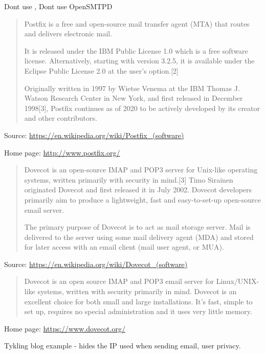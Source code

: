 \documentclass[Screen16to9,17pt]{foils}
\begin{document}
Dont use , Dont use OpenSMTPD




\begin{quote}
  Postfix is a free and open-source mail transfer agent (MTA) that routes and delivers electronic mail.

It is released under the IBM Public License 1.0 which is a free software license. Alternatively, starting with version 3.2.5, it is available under the Eclipse Public License 2.0 at the user's option.[2]

Originally written in 1997 by Wietse Venema at the IBM Thomas J. Watson Research Center in New York, and first released in December 1998[3], Postfix continues as of 2020 to be actively developed by its creator and other contributors.
\end{quote}
Source: \url{https://en.wikipedia.org/wiki/Postfix_(software)}

Home page: \url{http://www.postfix.org/}



\begin{quote}
Dovecot is an open-source IMAP and POP3 server for Unix-like operating systems, written primarily with security in mind.[3] Timo Sirainen originated Dovecot and first released it in July 2002. Dovecot developers primarily aim to produce a lightweight, fast and easy-to-set-up open-source email server.

The primary purpose of Dovecot is to act as mail storage server. Mail is delivered to the server using some mail delivery agent (MDA) and stored for later access with an email client (mail user agent, or MUA).
\end{quote}
Source: \url{https://en.wikipedia.org/wiki/Dovecot_(software)}

\begin{quote}
Dovecot is an open source IMAP and POP3 email server for Linux/UNIX-like systems, written with security primarily in mind. Dovecot is an excellent choice for both small and large installations. It's fast, simple to set up, requires no special administration and it uses very little memory.
\end{quote}
Home page: \url{https://www.dovecot.org/}



Tykling blog example - hides the IP used when sending email, user privacy.
\end{document}
